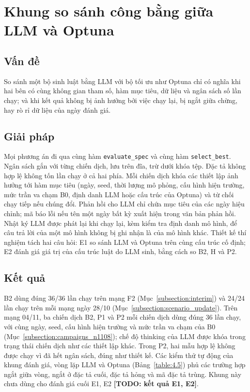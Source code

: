 \documentclass[../main.tex]{subfiles}
\begin{document}
\section{Khung so sánh công bằng giữa LLM và Optuna}
\label{section:5.7}

\subsection{Vấn đề}

So sánh một bộ sinh luật bằng LLM với bộ tối ưu như Optuna chỉ có nghĩa khi hai bên có cùng không gian tham số, hàm mục tiêu, dữ liệu và ngân sách số lần chạy; và khi kết quả không bị ảnh hưởng bởi việc chạy lại, bị ngắt giữa chừng, hay rò rỉ dữ liệu của ngày đánh giá.

\subsection{Giải pháp}

Mọi phương án đi qua cùng hàm \texttt{evaluate\_spec} và cùng hàm \texttt{select\_best}. Ngân sách gắn với từng chiến dịch, lưu trên đĩa, trừ dưới khóa tệp. Đặc tả không hợp lệ không tốn lần chạy ở cả hai phía. Mỗi chiến dịch khóa các thiết lập ảnh hưởng tới hàm mục tiêu (ngày, seed, thời lượng mô phỏng, cấu hình hiện trường, mức trần va chạm B0, định danh LLM hoặc cấu trúc của Optuna) và từ chối chạy tiếp nếu chúng đổi. Phản hồi cho LLM chỉ chứa mục tiêu của các ngày hiệu chỉnh; mã báo lỗi nếu tên một ngày bất kỳ xuất hiện trong văn bản phản hồi. Nhật ký LLM được phát lại khi chạy lại, kèm kiểm tra định danh mô hình, để câu trả lời của một mô hình không bị ghi nhận là của mô hình khác. Thiết kế thí nghiệm tách hai câu hỏi: E1 so sánh LLM và Optuna trên cùng cấu trúc cố định; E2 đánh giá giá trị của cấu trúc luật do LLM sinh, bằng cách so B2, H và P2.

\subsection{Kết quả}

B2 dùng đúng 36/36 lần chạy trên mạng F2 (Mục~\ref{subsection:interim}) và 24/24 lần chạy trên mỗi mạng ngày 28/10 (Mục~\ref{subsection:scenario_update}). Trên mạng 04/11, ba chiến dịch B2, P1 và P2 mỗi chiến dịch dùng đúng 36 lần chạy, với cùng ngày, seed, cấu hình hiện trường và mức trần va chạm của B0 (Mục~\ref{subsection:campaigns_n1108}); chế độ thinking của LLM được khóa trong trạng thái chiến dịch như các thiết lập khác. Trong P2, hai mẫu hợp lệ không được chạy vì đã hết ngân sách, đúng như thiết kế. Các kiểm thử tự động của khung đánh giá, vòng lặp LLM và Optuna (Bảng~\ref{table:4.5}) phủ các trường hợp ngắt giữa vòng, ngắt ở đặc tả cuối, đặc tả hỏng và mã đặc tả trùng. Khung này chưa dùng cho đánh giá cuối E1, E2 \textbf{[TODO: kết quả E1, E2]}.
\end{document}
